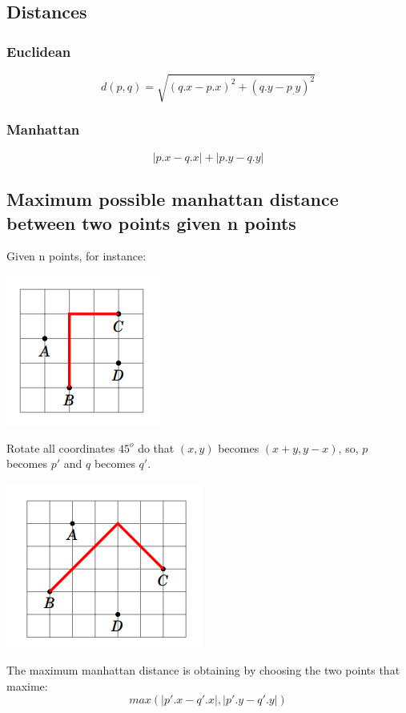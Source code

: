 \subsection{Distances}
\subsubsection{Euclidean}
$$ d(p,q)={\sqrt {(q.x-p.x)^{2}+(q.y-p_.y)^{2}}} $$
\subsubsection{Manhattan}
$$ |p.x - q.x| + |p.y - q.y| $$
\subsection{Maximum possible manhattan distance between two points given n points}
Given n points, for instance:
\begin{center}
    \includegraphics[scale=.6, keepaspectratio]{./Theory/images/manhattan_before.png}
\end{center}

Rotate all coordinates $45^{o}$ do that $(x, y)$ becomes $(x+y, y-x)$, so, $p$ becomes $p'$ and $q$ becomes $q'$.
\begin{center}
    \includegraphics[scale=.6, keepaspectratio]{./Theory/images/manhattan_after.png}
\end{center}

The maximum manhattan distance is obtaining by choosing the two points that maxime:
$$ max(|p'.x - q'.x|, |p'.y - q'.y|) $$